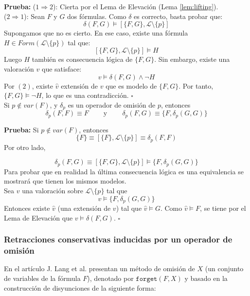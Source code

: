 \noindent \textbf{Prueba:} ($1 \Rightarrow 2$): Cierta por el Lema de Elevación (Lema \ref{lem:lifting}).\\
($2 \Rightarrow 1$): Sean $F$ y $G$ dos fórmulas. Como $\delta$ es correcto, basta probar que:
$$\delta (F,G) \vDash [\{ F,G \}, \mathcal{L} \setminus \{ p \}]$$
Supongamos que no es cierto. En ese caso, existe una fórmula $H \in Form(\mathcal{L} \setminus \{ p \})$ tal que: 
$$[\{ F,G \}, \mathcal{L} \setminus \{ p \}] \vDash H$$ 
Luego $H$ también es consecuencia lógica de $\{ F,G \}$. Sin embargo, existe una valoración $v$ que satisface: 
$$v \vDash \delta (F,G) \wedge \neg H$$ 
Por $(2)$, existe $\hat{v}$ extensión de $v$ que es modelo de $\{ F,G \}$. Por tanto, $\{ F,G \} \vDash \neg H$, lo que es una contradicción. \hspace{10.5cm} $\square$ \\

\vspace{-5mm}
\cor Si $p \notin var(F)$, y $\delta_p$ es un operador de omisión de $p$, entonces
$$\delta_p(F,F) \equiv F \;\;\;\;\;\;\;\; \text{y} \;\;\;\;\;\;\;\; \delta_p (F,G) \equiv \{ F,\delta_p (G,G) \}$$

\noindent \label{cor:pnotinvar} \textbf{Prueba:} Si $p \notin var(F)$, entonces 
$$\{ F \} \equiv [\{ F \} ,\mathcal{L} \setminus \{ p \}] \equiv \delta_p (F,F)$$
\vspace{-5mm}
Por otro lado, 

$$\delta_p (F,G) \equiv [\{ F,G \} , \mathcal{L} \setminus \{ p \}] \vDash \{ F,\delta_p (G,G) \}$$ Para probar que en realidad la última consecuencia lógica es una equivalencia se mostrará que tienen los mismos modelos.\\
Sea $v$ una valoración sobre $\mathcal{L} \setminus \{ p \}$ tal que $$v \vDash \{ F,\delta_p (G,G) \}$$ Entonces existe $\hat{v}$ (una extensión de $v$) tal que $\hat{v} \vDash G$. Como $\hat{v} \vDash F$, se tiene por el Lema de Elevación que $v \vDash \delta (F,G)$. \hspace{10cm} $\square$ 

\newpage 
 
\subsubsection{Retracciones conservativas inducidas por un operador de omisión} 
 
En el artículo \cite{Lang2003} J. Lang et al.  presentan un método de omisión de $X$ (un conjunto de variables de la fórmula $F$), denotado por $\texttt{forget}(F,X)$ y basado en la construcción de disyunciones de la siguiente forma:\\

